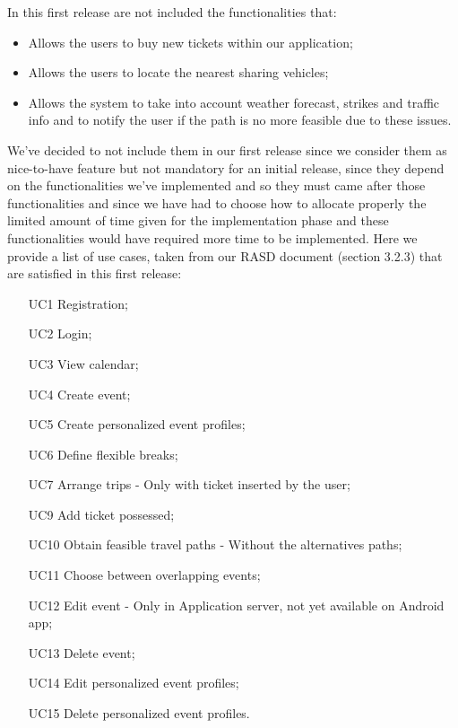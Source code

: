 In this first release are not included the functionalities that:
\begin{itemize}
	\item Allows the users to buy new tickets within our application;
	\item Allows the users to locate the nearest sharing vehicles;
	\item Allows the system to take into account weather forecast, strikes and traffic info and to notify the user if the path is no more feasible due to these issues.
\end{itemize} 
We've decided to not include them in our first release since we consider them as nice-to-have feature but not mandatory for an initial release, since they depend on the functionalities we've implemented and so they must came after those functionalities and since we have had to choose how to allocate properly the limited amount of time given for the implementation phase and these functionalities would have required more time to be implemented.
Here we provide a list of use cases, taken from our RASD document (section 3.2.3) that are satisfied in this first release:
\begin{itemize}
	\item [UC1] Registration;
	\item [UC2] Login;
	\item [UC3] View calendar;
	\item [UC4] Create event;
	\item [UC5] Create personalized event profiles;
	\item [UC6] Define flexible breaks;
	\item [UC7] Arrange trips - Only with ticket inserted by the user;
	\item [UC9] Add ticket possessed;
	\item [UC10] Obtain feasible travel paths - Without the alternatives paths;
	\item [UC11] Choose between overlapping events;
	\item [UC12] Edit event - Only in Application server, not yet available on Android app; 
	\item [UC13] Delete event;
	\item [UC14] Edit personalized event profiles;
	\item [UC15] Delete personalized event profiles.
\end{itemize}

